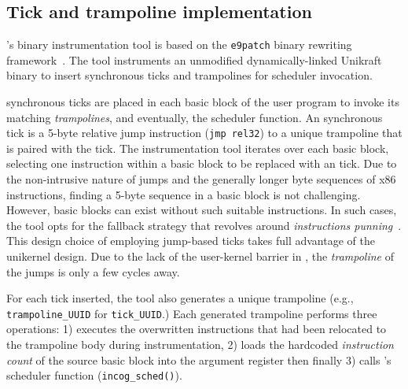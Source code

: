 \subsection{Tick and trampoline implementation}
\label{subsec:tick-tramp-impl}
\thename's binary instrumentation tool is based on the \texttt{e9patch} binary rewriting framework~\cite{e9patch}.
The tool instruments an unmodified dynamically-linked Unikraft binary to insert synchronous ticks and trampolines for \thename scheduler invocation.

\label{subsubsec:sync-ticks}
\thename synchronous ticks are placed in each basic block of the user program to invoke its matching \emph{trampolines}, and eventually, the scheduler function.
An \thename synchronous tick is a 5-byte relative jump instruction (\texttt{jmp rel32}) to a unique trampoline that is paired with the tick.
The instrumentation tool iterates over each basic block, selecting one instruction within a basic block to be replaced with an \thename tick.
Due to the non-intrusive nature of jumps and the generally longer byte sequences of x86 instructions, finding a 5-byte sequence in a basic block is not challenging.
However, basic blocks can exist without such suitable instructions.
In such cases, the tool opts for the fallback strategy that revolves around \emph{instructions punning}~\cite{e9patch,instruction-punning}.
This design choice of employing jump-based ticks takes full advantage of the unikernel design.
Due to the lack of the user-kernel barrier in \thename, the \emph{trampoline} of the jumps is only a few cycles away.

 For each tick inserted, the tool also generates a unique trampoline (e.g., \texttt{trampoline\_UUID} for \texttt{tick\_UUID}.)
Each generated trampoline performs three operations: 1) executes the overwritten instructions that had been relocated to the trampoline body during instrumentation, 2) loads the hardcoded \emph{instruction count} of the source basic block
into the argument register then finally 3) calls \thename's scheduler function (\texttt{incog\_sched()}).

